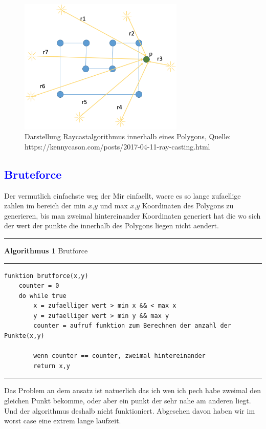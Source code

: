 \documentclass{article}
\begin{document}
\begin{figure}[h]
    \centering
    \includegraphics[width=0.7\textwidth]{Bilder/raycasting_polygon_3.png}
    \caption{Darstellung Raycastalgorithmus innerhalb eines Polygons, Quelle: https://kennycason.com/posts/2017-04-11-ray-casting.html}
    \label{fig:example}
\end{figure}

\subsection{\textcolor{blue}{Bruteforce}}
Der vermutlich einfachste weg der Mir einfaellt, waere es so lange zufaellige zahlen im bereich der min $x$,$y$ und max $x$,$y$ Koordinaten des Polygons zu generieren, bis man zweimal hintereinander Koordinaten generiert hat die wo sich der wert der punkte die innerhalb des Polygons liegen nicht aendert.
\vspace{5pt}
\hrule
\vspace{1.5pt}
\large{\textbf{Algorithmus 1} Brutforce}
\vspace{1.5pt}
\hrule
\begin{verbatim}
funktion brutforce(x,y)
	counter = 0
	do while true
		x = zufaelliger wert > min x && < max x
		y = zufaelliger wert > min y && max y
		counter = aufruf funktion zum Berechnen der anzahl der Punkte(x,y)
		
		wenn counter == counter, zweimal hintereinander
		return x,y 
\end{verbatim}
\hrule
\vspace{5pt}
Das Problem an dem ansatz ist natuerlich das ich wen ich pech habe zweimal den gleichen Punkt bekomme, oder aber ein punkt der sehr nahe am anderen liegt. Und der algorithmus deshalb nicht funktioniert. Abgesehen davon haben wir im worst case eine extrem lange laufzeit.
\end{document}
